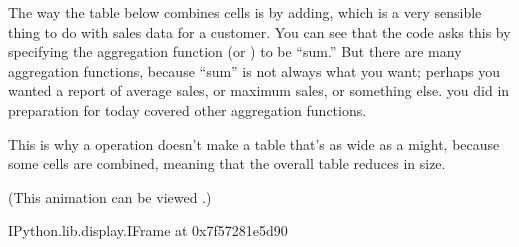 \documentclass[letterpaper,10pt,english]{jupyterBook}
\begin{document}
\sphinxAtStartPar
The way the table below combines cells is by adding, which is a very sensible thing to do with sales data for a customer.  You can see that the code asks this by specifying the aggregation function (or ) to be “sum.”  But there are many aggregation functions, because “sum” is not always what you want; perhaps you wanted a report of average sales, or maximum sales, or something else.   you did in preparation for today covered other aggregation functions.

\sphinxAtStartPar
This is why a  operation doesn’t make a table that’s as wide as a  might, because some cells are combined, meaning that the overall table reduces in size.

\sphinxAtStartPar
(This animation can be viewed .)

\begin{sphinxVerbatim}[commandchars=\\\{\}]
\PYGZlt{}IPython.lib.display.IFrame at 0x7f57281e5d90\PYGZgt{}
\end{sphinxVerbatim}
\end{document}
